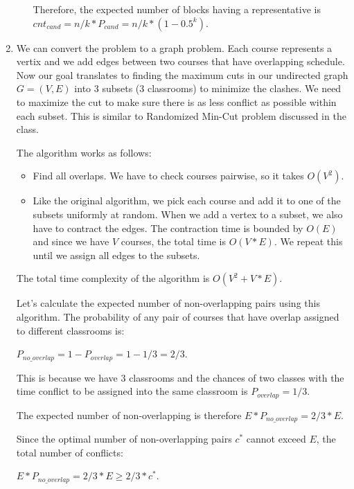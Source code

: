 \documentclass{article}
\begin{document}
\begin{enumerate}
\begin{enumerate}
    Therefore, the expected number of blocks having a representative is $cnt_{cand}=n/k*P_{cand}=n/k*(1-0.5^k)$.
  \end{enumerate}

  \item We can convert the problem to a graph problem.
  Each course represents a vertix and we add edges between two courses that have overlapping schedule.
  Now our goal translates to finding the maximum cuts in our undirected graph $G=(V,E)$ into 3 subsets (3 classrooms) to minimize the clashes.
  We need to maximize the cut to make sure there is as less conflict as possible within each subset.
  This is similar to Randomized Min-Cut problem discussed in the class.

  The algorithm works as follows:

  \begin{itemize}
    \item Find all overlaps.
    We have to check courses pairwise, so it takes $O(V^2)$.
    \item Like the original algorithm, we pick each course and add it to one of the subsets uniformly at random.
    When we add a vertex to a subset, we also have to contract the edges.
    The contraction time is bounded by $O(E)$ and since we have $V$ courses, the total time is $O(V*E)$.
    We repeat this until we assign all edges to the subsets.
  \end{itemize}

  The total time complexity of the algorithm is $O(V^2+V*E)$.

  Let's calculate the expected number of non-overlapping pairs using this algorithm.
  The probability of any pair of courses that have overlap assigned to different classrooms is:

  $P_{no\_overlap}=1-P_{overlap}=1-1/3=2/3$.

  This is because we have 3 classrooms and the chances of two classes with the time conflict to be assigned into the same classroom is $P_{overlap}=1/3$.
  
  The expected number of non-overlapping is therefore $E*P_{no\_overlap}=2/3*E$.

  Since the optimal number of non-overlapping pairs $c^*$ cannot exceed $E$, the total number of conflicts:

  $E*P_{no\_overlap}=2/3*E\geq 2/3*c^*$.


  


\end{enumerate}
\end{document}
